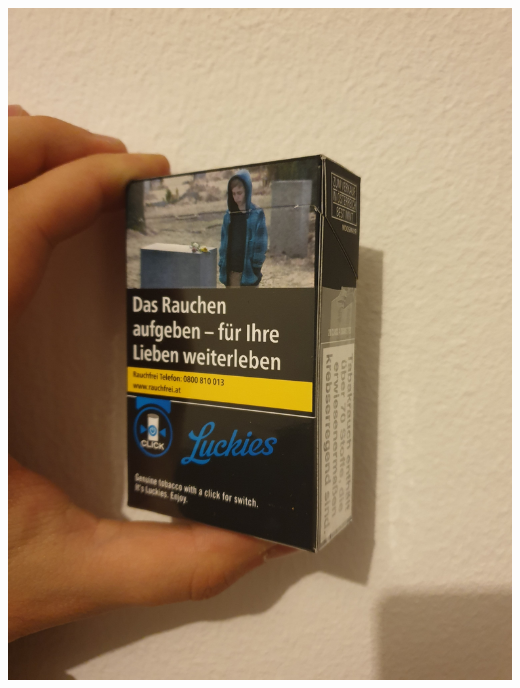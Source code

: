 \documentclass{mrtrash}
\begin{document}
\begin{minipage}[h]{\textwidth}
    \centering
    \includegraphics[height=\textwidth, angle=-90]{ref2.jpg}
\end{minipage}
%
%
\end{document}
